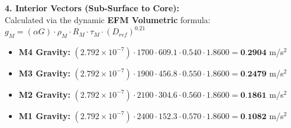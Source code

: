 \documentclass[11pt, a4paper]{article}
\begin{document}
  \vspace{0.5em}
  \noindent \textbf{4. Interior Vectors (Sub-Surface to Core):} \\[0.5em]
  \hspace*{1em} Calculated via the dynamic \textbf{EFM Volumetric} formula: $g_M = (\alpha G) \cdot \rho_{M} \cdot R_M \cdot \tau_M \cdot (D_{ref})^{0.21}$
  \begin{itemize}
    \item \textbf{M4 Gravity:} $(2.792 \times 10^{-7}) \cdot 1700 \cdot 609.1 \cdot 0.540 \cdot 1.8600 = \textbf{0.2904}$ m/s$^2$
    \item \textbf{M3 Gravity:} $(2.792 \times 10^{-7}) \cdot 1900 \cdot 456.8 \cdot 0.550 \cdot 1.8600 = \textbf{0.2479}$ m/s$^2$
    \item \textbf{M2 Gravity:} $(2.792 \times 10^{-7}) \cdot 2100 \cdot 304.6 \cdot 0.560 \cdot 1.8600 = \textbf{0.1861}$ m/s$^2$
    \item \textbf{M1 Gravity:} $(2.792 \times 10^{-7}) \cdot 2400 \cdot 152.3 \cdot 0.570 \cdot 1.8600 = \textbf{0.1082}$ m/s$^2$
  \end{itemize}
\end{document}

